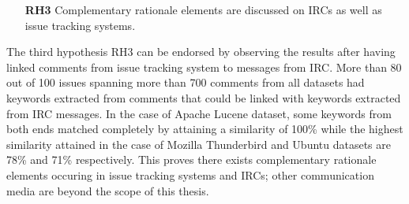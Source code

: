 \documentclass[a4paper,12pt,twoside]{report}
\begin{document}
\begin{itemize}
\item[\textbf{RH3}] Complementary rationale elements are discussed on \acs{IRC}s as well as issue tracking systems.
\end{itemize}
The third hypothesis RH3 can be endorsed by observing the results after having linked comments from issue tracking system to messages from \acs{IRC}. More than 80 out of 100 issues spanning more than 700 comments from all datasets had keywords extracted from comments that could be linked with keywords extracted from \acs{IRC} messages. In the case of Apache Lucene dataset, some keywords from both ends matched completely by attaining a similarity of 100\% while the highest similarity attained in the case of Mozilla Thunderbird and Ubuntu datasets are 78\% and 71\% respectively. This proves there exists complementary rationale elements occuring in issue tracking systems and \acs{IRC}s; other communication media are beyond the scope of this thesis.
\end{document}
